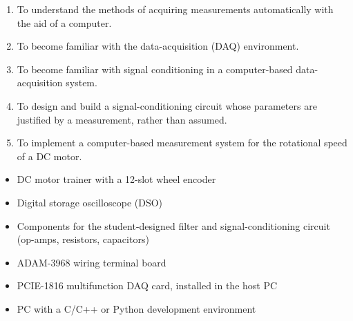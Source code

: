 
\begin{objectives}
  \begin{enumerate}
    \item To understand the methods of acquiring measurements automatically with the aid of a computer.
    \item To become familiar with the data-acquisition (DAQ) environment.
    \item To become familiar with signal conditioning in a computer-based data-acquisition system.
    \item To design and build a signal-conditioning circuit whose parameters are justified by a measurement, rather than assumed.
    \item To implement a computer-based measurement system for the rotational speed of a DC motor.
  \end{enumerate}
\end{objectives}

\begin{equipment}
  \begin{itemize}
    \item DC motor trainer with a 12-slot wheel encoder
    \item Digital storage oscilloscope (DSO)
    \item Components for the student-designed filter and signal-conditioning circuit (op-amps, resistors, capacitors)
    \item ADAM-3968 wiring terminal board
    \item PCIE-1816 multifunction DAQ card, installed in the host PC
    \item PC with a C/C++ or Python development environment
  \end{itemize}
\end{equipment}

